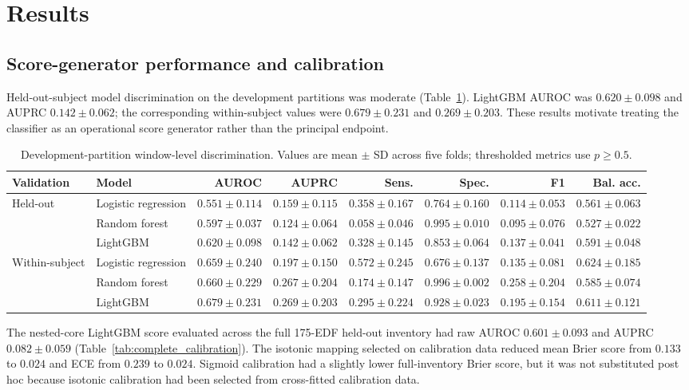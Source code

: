 \documentclass[11pt,a4paper]{article}
\begin{document}
\section{Results}

\subsection{Score-generator performance and calibration}
Held-out-subject model discrimination on the development partitions was moderate (Table~\ref{tab:performance}). LightGBM AUROC was $0.620\pm0.098$ and AUPRC $0.142\pm0.062$; the corresponding within-subject values were $0.679\pm0.231$ and $0.269\pm0.203$. These results motivate treating the classifier as an operational score generator rather than the principal endpoint.

\begin{table}[H]
\centering
\caption{Development-partition window-level discrimination. Values are mean $\pm$ SD across five folds; thresholded metrics use $p\geq0.5$.}
\label{tab:performance}
\scriptsize
\setlength{\tabcolsep}{2pt}
\renewcommand{\arraystretch}{1.15}
\begin{tabular}{llrrrrrr}
\toprule
Validation & Model & AUROC & AUPRC & Sens. & Spec. & F1 & Bal. acc. \\
\midrule
\multirow{3}{*}{Held-out}
& Logistic regression & $0.551\pm0.114$ & $0.159\pm0.115$ & $0.358\pm0.167$ & $0.764\pm0.160$ & $0.114\pm0.053$ & $0.561\pm0.063$ \\
& Random forest & $0.597\pm0.037$ & $0.124\pm0.064$ & $0.058\pm0.046$ & $0.995\pm0.010$ & $0.095\pm0.076$ & $0.527\pm0.022$ \\
& LightGBM & $0.620\pm0.098$ & $0.142\pm0.062$ & $0.328\pm0.145$ & $0.853\pm0.064$ & $0.137\pm0.041$ & $0.591\pm0.048$ \\
\midrule
\multirow{3}{*}{Within-subject}
& Logistic regression & $0.659\pm0.240$ & $0.197\pm0.150$ & $0.572\pm0.245$ & $0.676\pm0.137$ & $0.135\pm0.081$ & $0.624\pm0.185$ \\
& Random forest & $0.660\pm0.229$ & $0.267\pm0.204$ & $0.174\pm0.147$ & $0.996\pm0.002$ & $0.258\pm0.204$ & $0.585\pm0.074$ \\
& LightGBM & $0.679\pm0.231$ & $0.269\pm0.203$ & $0.295\pm0.224$ & $0.928\pm0.023$ & $0.195\pm0.154$ & $0.611\pm0.121$ \\
\bottomrule
\end{tabular}
\end{table}

The nested-core LightGBM score evaluated across the full 175-EDF held-out inventory had raw AUROC $0.601\pm0.093$ and AUPRC $0.082\pm0.059$ (Table~\ref{tab:complete_calibration}). The isotonic mapping selected on calibration data reduced mean Brier score from $0.133$ to $0.024$ and ECE from $0.239$ to $0.024$. Sigmoid calibration had a slightly lower full-inventory Brier score, but it was not substituted post hoc because isotonic calibration had been selected from cross-fitted calibration data.
\end{document}
